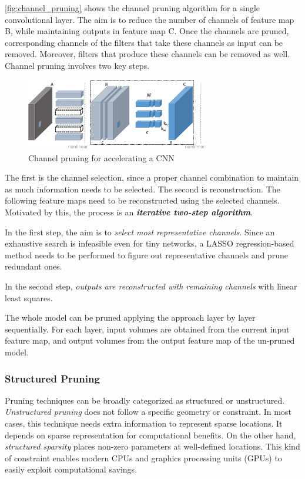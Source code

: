 \autoref{fig:channel_pruning} shows the channel pruning algorithm for a
single convolutional layer.
The aim is to reduce the number of channels of feature map B, while maintaining
outputs in feature map C.
Once the channels are pruned, corresponding channels of the filters that take
these channels as input can be removed. Moreover, filters that produce these
channels can be removed as well. Channel pruning involves two key steps.

\begin{figure}[ht]
    \includegraphics[width=8cm]{images/pruning/channel_pruning.png}
    \centering
    \caption{Channel pruning for accelerating a CNN}\label{fig:channel_pruning}
\end{figure}

The first is the channel selection, since a proper channel combination to
maintain as much information needs to be selected.
The second is reconstruction. The following feature maps need to be
reconstructed using the selected channels. Motivated by this, the process is an
\textit{\textbf{iterative two-step algorithm}}.

In the first step, the aim is to \textit{select most representative channels}.
Since an exhaustive search is infeasible even for tiny networks, a LASSO
regression-based method needs to be performed to figure out representative
channels and prune redundant ones.

In the second step, \textit{outputs are reconstructed with remaining channels}
with linear least squares.

The whole model can be pruned applying the approach layer by layer
sequentially. For each layer, input volumes are obtained from the current input
feature map, and output volumes from the output feature map of the un-pruned
model.\cite{He_2017}

\subsubsection{Structured Pruning}
Pruning techniques can be broadly categorized as structured or unstructured.
\textit{Unstructured pruning} does not follow a specific geometry or
constraint. In most cases, this technique needs extra information to represent
sparse locations. It depends on sparse representation for computational
benefits.
On the other hand, \textit{structured sparsity} places non-zero parameters at
well-defined locations. This kind of constraint enables modern CPUs and
graphics processing units (GPUs) to easily exploit computational savings.

